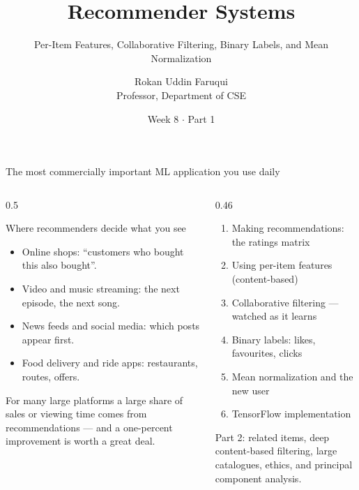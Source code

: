 \documentclass[aspectratio=169,10pt]{beamer}
\title[CSE 815 -- Week 8, Part 1]{Recommender Systems}
\subtitle{Per-Item Features, Collaborative Filtering, Binary Labels, and Mean Normalization}
\author{Rokan Uddin Faruqui\\ \small Professor, Department of CSE}
\institute{\small University of Chittagong \\ \texttt{rufaruqui@cu.ac.bd}}
\date[Week 8 / Part 1]{Week 8 $\cdot$ Part 1}
\begin{document}
\begin{frame}
  \titlepage
\end{frame}

\begin{frame}{The most commercially important ML application you use daily}
  \begin{columns}[T,onlytextwidth]
    \begin{column}{0.5\textwidth}
      \begin{block}{Where recommenders decide what you see}
        \footnotesize
        \begin{itemize}
          \item Online shops: ``customers who bought this also bought''.
          \item Video and music streaming: the next episode, the next song.
          \item News feeds and social media: which posts appear first.
          \item Food delivery and ride apps: restaurants, routes, offers.
        \end{itemize}
      \end{block}
      \footnotesize
      For many large platforms a large share of sales or viewing time comes from
      recommendations --- and a one-percent improvement is worth a great deal.
    \end{column}
    \begin{column}{0.46\textwidth}
      \begin{keyidea}[Today]
        \footnotesize
        \begin{enumerate}
          \item Making recommendations: the ratings matrix
          \item Using per-item features (content-based)
          \item Collaborative filtering --- watched as it learns
          \item Binary labels: likes, favourites, clicks
          \item Mean normalization and the new user
          \item TensorFlow implementation
        \end{enumerate}
      \end{keyidea}
      \footnotesize Part 2: related items, deep content-based filtering, large
      catalogues, ethics, and principal component analysis.
    \end{column}
  \end{columns}
\end{frame}
\end{document}
